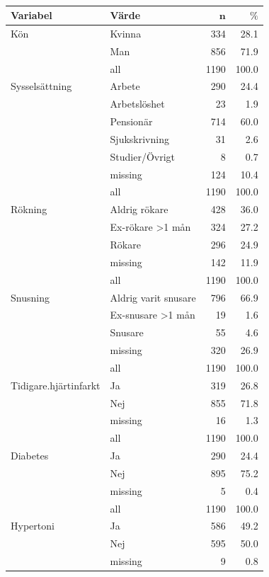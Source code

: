 \begin{table}[htbp]
\centering
\caption{} 
\label{}
{\footnotesize
\begin{tabular}{ll|rr}
 \textbf{Variabel} & \textbf{Värde} & $\mathbf{n}$ & $\mathbf{\%}$ \\ 
  \hline
Kön & Kvinna & 334 & 28.1 \\ 
   & Man & 856 & 71.9 \\ 
   \hline
 & all & 1190 & 100.0 \\ 
   \hline
\hline
Sysselsättning & Arbete & 290 & 24.4 \\ 
   & Arbetslöshet & 23 & 1.9 \\ 
   & Pensionär & 714 & 60.0 \\ 
   & Sjukskrivning & 31 & 2.6 \\ 
   & Studier/Övrigt & 8 & 0.7 \\ 
   & missing & 124 & 10.4 \\ 
   \hline
 & all & 1190 & 100.0 \\ 
   \hline
\hline
Rökning & Aldrig rökare & 428 & 36.0 \\ 
   & Ex-rökare >1 mån & 324 & 27.2 \\ 
   & Rökare & 296 & 24.9 \\ 
   & missing & 142 & 11.9 \\ 
   \hline
 & all & 1190 & 100.0 \\ 
   \hline
\hline
Snusning & Aldrig varit snusare & 796 & 66.9 \\ 
   & Ex-snusare >1 mån & 19 & 1.6 \\ 
   & Snusare & 55 & 4.6 \\ 
   & missing & 320 & 26.9 \\ 
   \hline
 & all & 1190 & 100.0 \\ 
   \hline
\hline
Tidigare.hjärtinfarkt & Ja & 319 & 26.8 \\ 
   & Nej & 855 & 71.8 \\ 
   & missing & 16 & 1.3 \\ 
   \hline
 & all & 1190 & 100.0 \\ 
   \hline
\hline
Diabetes & Ja & 290 & 24.4 \\ 
   & Nej & 895 & 75.2 \\ 
   & missing & 5 & 0.4 \\ 
   \hline
 & all & 1190 & 100.0 \\ 
   \hline
\hline
Hypertoni & Ja & 586 & 49.2 \\ 
   & Nej & 595 & 50.0 \\ 
   & missing & 9 & 0.8 \\ 

\end{tabular}}
\end{table}
